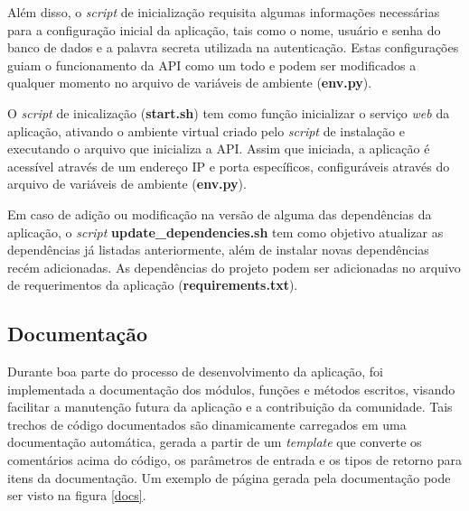 Além disso, o \textit{script} de inicialização requisita algumas informações necessárias para a configuração inicial da aplicação, tais como o nome, usuário e senha do banco de dados e a palavra secreta utilizada na autenticação. Estas configurações guiam o funcionamento da API como um todo e podem ser modificados a qualquer momento no arquivo de variáveis de ambiente (\textbf{env.py}).

O \textit{script} de inicalização (\textbf{start.sh}) tem como função inicializar o serviço \textit{web} da aplicação, ativando o ambiente virtual criado pelo \textit{script} de instalação e executando o arquivo que inicializa a API. Assim que iniciada, a aplicação é acessível através de um endereço IP e porta específicos, configuráveis através do arquivo de variáveis de ambiente (\textbf{env.py}).

Em caso de adição ou modificação na versão de alguma das dependências da aplicação, o \textit{script} \textbf{update\_dependencies.sh} tem como objetivo atualizar as dependências já listadas anteriormente, além de instalar novas dependências recém adicionadas. As dependências do projeto podem ser adicionadas no arquivo de requerimentos da aplicação (\textbf{requirements.txt}).

\subsection{Documentação}

Durante boa parte do processo de desenvolvimento da aplicação, foi implementada a documentação dos módulos, funções e métodos escritos, visando facilitar a manutenção futura da aplicação e a contribuição da comunidade. Tais trechos de código documentados são dinamicamente carregados em uma documentação automática, gerada a partir de um \textit{template} que converte os comentários acima do código, os parâmetros de entrada e os tipos de retorno para itens da documentação. Um exemplo de página gerada pela documentação pode ser visto na figura \ref{docs}.

